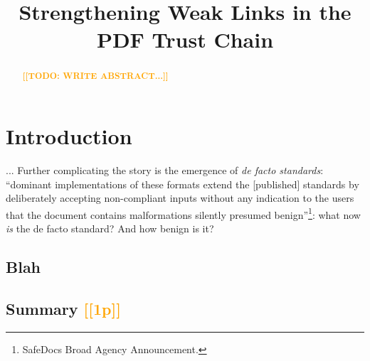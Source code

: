 \documentclass[conference,12pt]{IEEEtran}
\newcommand{\note}[1]{\noteYes{#1}}
\newcommand{\noteYes}[1]{\textbf{\textcolor{orange}{[[#1]]}}}
\newcommand{\todo}[1]{\note{TODO: #1}}
\begin{document}
\date{}

\title{Strengthening Weak Links in the PDF Trust Chain}

\author{
     \and
}

\maketitle

\begin{abstract}

\todo{WRITE ABSTRACT...}
  
\end{abstract}


\section{Introduction}


... Further complicating the story is the emergence of \emph{de facto standards}: ``dominant implementations of these formats extend the [published] standards by deliberately accepting non-compliant inputs without any indication to the users that the document contains malformations silently presumed benign''\footnote{SafeDocs Broad Agency Announcement.}: what now \emph{is} the de facto standard?  And how benign is it?

\subsection{Blah}

\subsection{Summary \note{1p}}
\end{document}
